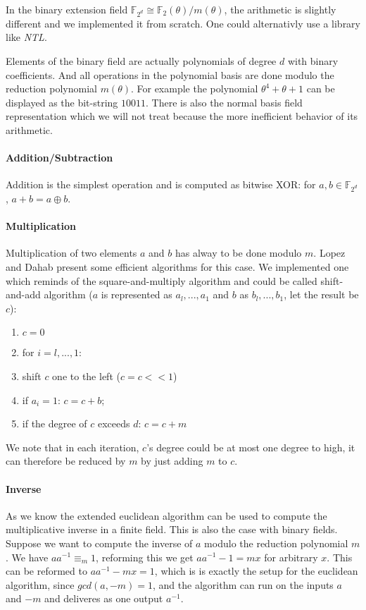 \documentclass[11pt,english]{article}
\begin{document}
In the binary extension field $\mathbb{F}_{2^d}\cong \mathbb{F}_2(\theta)/m(\theta)$, the arithmetic is slightly different and we implemented it from scratch. One could alternativly use a library like \emph{NTL}.

Elements of the binary field are actually polynomials of degree $d$ with binary coefficients. And all operations in the polynomial basis are done modulo the reduction polynomial $m(\theta)$. For example the polynomial $\theta^4+\theta+1$ can be displayed as the bit-string $10011$. There is also the normal basis field representation which we will not treat because the more inefficient behavior of its arithmetic.

\paragraph{Addition/Subtraction}
Addition is the simplest operation and is computed as bitwise XOR: for $a,b\in \mathbb{F}_{2^d}$, $a+b=a\oplus b$.
\paragraph{Multiplication}
Multiplication of two elements $a$ and $b$ has alway to be done modulo $m$. Lopez and Dahab \cite{715867} present some efficient algorithms for this case. We implemented one which reminds of the square-and-multiply algorithm and could be called shift-and-add algorithm ($a$ is represented as $a_l,...,a_1$ and $b$ as $b_l,...,b_1$, let the result be $c$):
\begin{enumerate}
 \item $c=0$
 \item for $i=l,...,1$:
 \item shift $c$ one to the left ($c=c<<1$)
 \item if $a_i=1$: $c=c+b$;
 \item if the degree of $c$ exceeds $d$: $c=c+m$
\end{enumerate}
We note that in each iteration, $c$'s degree could be at most one degree to high, it can therefore be reduced by $m$ by just adding $m$ to $c$.

\paragraph{Inverse}
As we know the extended euclidean algorithm can be used to compute the multiplicative inverse in a finite field. This is also the case with binary fields. Suppose we want to compute the inverse of $a$ modulo the reduction polynomial $m$. We have $aa^{-1}\equiv_m 1$, reforming this we get $aa^{-1}-1=mx$ for arbitrary $x$. This can be reformed to $aa^{-1}-mx=1$, which is is exactly the setup for the euclidean algorithm, since $gcd(a,-m)=1$, and the algorithm can run on the inputs $a$ and $-m$ and deliveres as one output $a^{-1}$.
\end{document}
